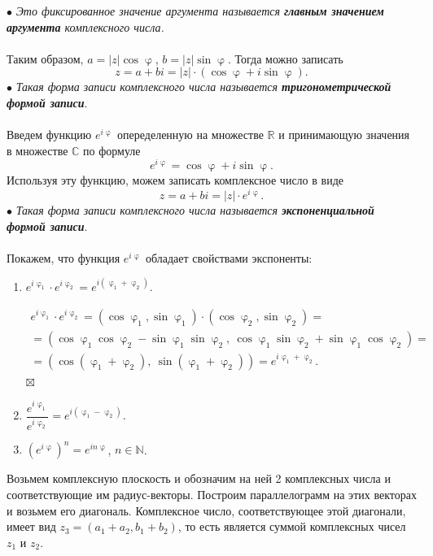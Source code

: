 \documentclass[a4paper, 12pt]{article}
\newenvironment{Proof} %
{\par\noindent{$\blacklozenge$}} %
{\hfill$\scriptstyle\boxtimes$}
\newcommand{\Rm}{\mathbb{R}}
\newcommand{\Cm}{\mathbb{C}}
\newcommand{\N}{\mathbb{N}}
\renewcommand{\varphi}{\upvarphi}
\newcommand\ef[1]{e^{i#1}}
\begin{document}
$\bullet$ \textit{Это фиксированное значение аргумента называется \textbf{главным значением аргумента} комплексного числа.}\\\\
Таким образом, $a = |z|\cos \varphi$, $b = |z|\sin\varphi$. Тогда можно записать $$z = a + bi = |z|\cdot (\cos \varphi + i\sin\varphi).$$
$\bullet$ \textit{Такая форма записи комплексного числа называется \textbf{тригонометрической формой записи}}.\\\\
Введем функцию $e^{i\varphi}$ опеределенную на множестве $\Rm$ и принимающую значения в множестве $\Cm$ по формуле $$e^{i\varphi} = \cos\varphi + i\sin\varphi.$$
Используя эту функцию, можем записать комплексное число в виде $$z = a+bi = |z|\cdot e^{i\varphi}.$$
$\bullet$ \textit{Такая форма записи комплексного числа называется \textbf{экспоненциальной формой записи}}.\\\\
Покажем, что функция $e^{i\varphi}$ обладает свойствами экспоненты:
\begin{enumerate}
	\item $\ef{\varphi_1}\cdot \ef{\varphi_2} = \ef{(\varphi_1 + \varphi_2)}$.
	\begin{Proof}
		\begin{multline*}
			\ef{\varphi_1}\cdot \ef{\varphi_2} = (\cos\varphi_1, \sin\varphi_1)\cdot (\cos\varphi_2, \sin\varphi_2) =\\= (\cos\varphi_1\cos\varphi_2-\sin\varphi_1\sin\varphi_2,\ \cos\varphi_1\sin\varphi_2 + \sin\varphi_1\cos\varphi_2)=\\=(\cos(\varphi_1 + \varphi_2),\ \sin(\varphi_1 + \varphi_2)) = \ef{\varphi_1 + \varphi_2}.
		\end{multline*}
	\end{Proof}
\item $\dfrac{\ef{\varphi_1}}{\ef{\varphi_2}} = \ef{(\varphi_1 - \varphi_2)}.$
\item $(\ef{\varphi})^n = \ef{n\varphi}$, $n\in \N$.
\end{enumerate}
\noindent
\parbox[b][4cm][t]{90mm}{
	Возьмем комплексную плоскость и обозначим на ней 2 комплексных числа и соответствующие им радиус-векторы. Построим параллелограмм на этих векторах и возьмем его диагональ. Комплексное число, соответствующее этой диагонали, имеет вид $z_3 = (a_1 + a_2, b_1 + b_2)$, то есть является суммой комплексных чисел $z_1$ и $z_2$.
	}
\hfill
\end{document}
